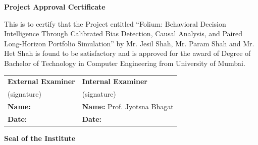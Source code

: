 \thispagestyle{empty}
\vspace*{0.2cm}
\vspace{1cm}
\begin{center}
\large\textbf{Project Approval Certificate}
\end{center}
\vspace{2cm}
This is to certify that the Project entitled ``Folium: Behavioral Decision Intelligence Through Calibrated Bias Detection, Causal Analysis, and Paired Long-Horizon Portfolio Simulation'' by Mr. Jesil Shah, Mr. Param Shah and Mr. Het Shah is found to be satisfactory and is approved for the award of Degree of Bachelor of Technology in Computer Engineering from University of Mumbai.

\vspace{3cm}
\noindent
\begin{tabular}{@{}p{}@{}p{}@{}}
\textbf{External Examiner} & \hfill\textbf{Internal Examiner} \\[2.2cm]
(signature) & \hfill(signature) \\[1cm]
\textbf{Name:} & \hfill\textbf{Name:} Prof. Jyotsna Bhagat \\[2cm]
\textbf{Date:} & \hfill\textbf{Date:} \hspace{2.5cm}
\end{tabular}

\vspace{2.5cm}
\begin{center}
\textbf{Seal of the Institute}
\end{center}
\newpage
